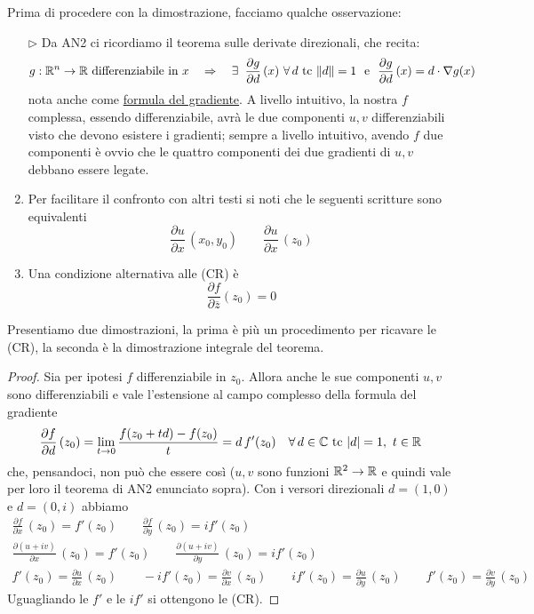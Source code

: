 Prima di procedere con la dimostrazione, facciamo qualche osservazione:
\begin{enumerate}
    \item [$\triangleright$] Da AN2 ci ricordiamo il teorema sulle derivate direzionali, che recita:
    \begin{equation*}
    g:\RR^n\to\RR\text{ differenziabile in }x\quad\Rightarrow\quad \exists\ \frac{\partial g}{\partial d}\,(x)\ \forall d\text{ tc }\Vert d\Vert=1\ \text{ e }\ \frac{\partial g}{\partial d}\,(x)=d\cdot \nabla g(x)
    \end{equation*}
    nota anche come \underline{formula del gradiente}. A livello intuitivo, la nostra $f$ complessa, essendo differenziabile, avrà le due componenti $u,v$ differenziabili visto che devono esistere i gradienti; sempre a livello intuitivo, avendo $f$ due componenti è ovvio che le quattro componenti dei due gradienti di $u,v$ debbano essere legate. 

    \item Per facilitare il confronto con altri testi si noti che le seguenti scritture sono equivalenti
    \begin{equation*}
    \frac{\partial u}{\partial x}\,(x_0,y_0)\qquad\frac{\partial u}{\partial x}\,(z_0)
    \end{equation*}

    \item Una condizione alternativa alle (CR) è
    \begin{equation*}
    \frac{\partial f}{\partial\overline{z}}(z_0)=0
    \end{equation*}

\end{enumerate}

Presentiamo due dimostrazioni, la prima è più un procedimento per ricavare le (CR), la seconda è la dimostrazione integrale del teorema.

\begin{proof}
Sia per ipotesi $f$ differenziabile in $z_0$. Allora anche le sue componenti $u,v$ sono differenziabili e vale l'estensione al campo complesso della formula del gradiente
\begin{equation*}
\frac{\partial f}{\partial d}\,(z_0)=\lim_{t\to 0}\frac{f(z_0+td)-f(z_0)}{t}=d\,f'(z_0)\quad \forall d\in\CC\text{ tc }|d|=1,\ t\in\RR
\end{equation*}
che, pensandoci, non può che essere così ($u,v$ sono funzioni $\mathbb{R}^2\to\mathbb{R}$ e quindi vale per loro il teorema di AN2 enunciato sopra). Con i versori direzionali $d=(1,0)$ e $d=(0,i)$ abbiamo
\begin{gather*}
\frac{\partial f}{\partial x}\,(z_0)=f'(z_0) \qquad \frac{\partial f}{\partial y}\,(z_0)=if'(z_0) \\
\frac{\partial (u+iv)}{\partial x}\,(z_0)=f'(z_0) \qquad \frac{\partial (u+iv)}{\partial y}\,(z_0)=if'(z_0) \\
f'(z_0)=\frac{\partial u}{\partial x}\,(z_0) \qquad -if'(z_0)=\frac{\partial v}{\partial x}\,(z_0) \qquad if'(z_0)=\frac{\partial u}{\partial y}\,(z_0)\qquad f'(z_0)=\frac{\partial v}{\partial y}\,(z_0)
\end{gather*}
Uguagliando le $f'$ e le $if'$ si ottengono le (CR).
\end{proof}

